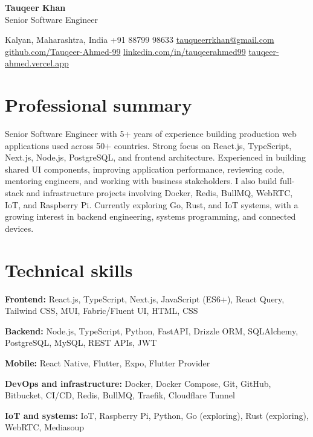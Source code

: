 \documentclass[10pt,a4paper]{article}
\newcommand{\resumeHeader}[2]{
    \begin{center}
        {\LARGE \textbf{#1}}\\[3pt]
        #2
    \end{center}
}
\begin{document}
\resumeHeader{Tauqeer Khan}{
    Senior Software Engineer
}

\begin{center}
    Kalyan, Maharashtra, India
    \textbar{}
    +91 88799 98633
    \textbar{}
    \href{mailto:tauqueerrkhan@gmail.com}{tauqueerrkhan@gmail.com}
    \\[2pt]
    \href{https://github.com/Tauqeer-Ahmed-99}{github.com/Tauqeer-Ahmed-99}
    \textbar{}
    \href{https://www.linkedin.com/in/tauqeerahmed99}{linkedin.com/in/tauqeerahmed99}
    \textbar{}
    \href{https://tauqeer-portfolio-green.vercel.app/}{tauqeer-ahmed.vercel.app}
\end{center}

\section{Professional summary}

Senior Software Engineer with 5+ years of experience building production web applications used across 50+ countries. Strong focus on React.js, TypeScript, Next.js, Node.js, PostgreSQL, and frontend architecture. Experienced in building shared UI components, improving application performance, reviewing code, mentoring engineers, and working with business stakeholders. I also build full-stack and infrastructure projects involving Docker, Redis, BullMQ, WebRTC, IoT, and Raspberry Pi. Currently exploring Go, Rust, and IoT systems, with a growing interest in backend engineering, systems programming, and connected devices.

\section{Technical skills}

\textbf{Frontend:}
React.js, TypeScript, Next.js, JavaScript (ES6+), React Query, Tailwind CSS, MUI, Fabric/Fluent UI, HTML, CSS

\textbf{Backend:}
Node.js, TypeScript, Python, FastAPI, Drizzle ORM, SQLAlchemy, PostgreSQL, MySQL, REST APIs, JWT

\textbf{Mobile:}
React Native, Flutter, Expo, Flutter Provider

\textbf{DevOps and infrastructure:}
Docker, Docker Compose, Git, GitHub, Bitbucket, CI/CD, Redis, BullMQ, Traefik, Cloudflare Tunnel

\textbf{IoT and systems:}
IoT, Raspberry Pi, Python, Go (exploring), Rust (exploring), WebRTC, Mediasoup
\end{document}
